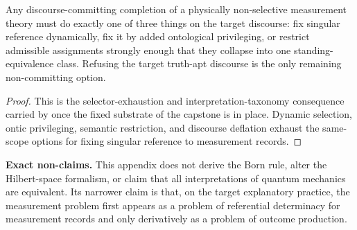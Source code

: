 \begin{corollary}
Any discourse-committing completion of a physically non-selective measurement theory must do exactly one of three things on the target discourse: fix singular reference dynamically, fix it by added ontological privileging, or restrict admissible assignments strongly enough that they collapse into one standing-equivalence class. Refusing the target truth-apt discourse is the only remaining non-committing option.
\end{corollary}

\begin{proof}
This is the selector-exhaustion and interpretation-taxonomy consequence carried by \measurementdoc{} once the fixed substrate of the capstone is in place. Dynamic selection, ontic privileging, semantic restriction, and discourse deflation exhaust the same-scope options for fixing singular reference to measurement records.\cite{MaleyMeasurement}
\end{proof}

\begin{reviewbox}
\textbf{Exact non-claims.} This appendix does not derive the Born rule, alter the Hilbert-space formalism, or claim that all interpretations of quantum mechanics are equivalent. Its narrower claim is that, on the target explanatory practice, the measurement problem first appears as a problem of referential determinacy for measurement records and only derivatively as a problem of outcome production.\cite{MaleyMeasurement}
\end{reviewbox}
